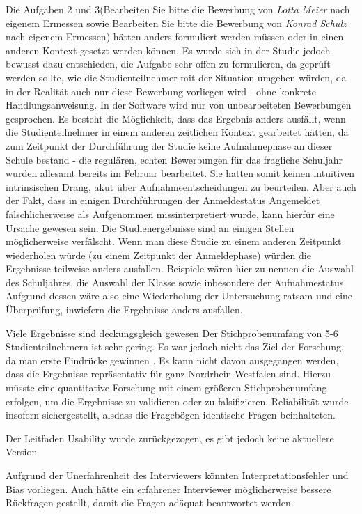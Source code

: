 Die Aufgaben 2 und 3(\glqq Bearbeiten Sie bitte die Bewerbung von \textit{Lotta Meier} nach eigenem Ermessen\grqq{} sowie \grqq{}Bearbeiten Sie bitte die Bewerbung von \textit{Konrad Schulz} nach eigenem Ermessen\grqq{}) hätten anders formuliert werden müssen oder in einen anderen Kontext gesetzt werden können. Es wurde sich in der Studie jedoch bewusst dazu entschieden, die Aufgabe sehr offen zu formulieren, da geprüft werden sollte, wie die Studienteilnehmer mit der Situation umgehen würden, da in der Realität auch nur diese Bewerbung vorliegen wird - ohne konkrete Handlungsanweisung. In der Software wird nur von \glqq unbearbeiteten Bewerbungen\grqq{} gesprochen. Es besteht die Möglichkeit, dass das Ergebnis anders ausfällt, wenn die Studienteilnehmer in einem anderen zeitlichen Kontext gearbeitet hätten, da zum Zeitpunkt der Durchführung der Studie keine Aufnahmephase an dieser Schule bestand - die regulären, echten Bewerbungen für das fragliche Schuljahr wurden allesamt bereits im Februar bearbeitet. Sie hatten somit keinen intuitiven intrinsischen Drang, akut über Aufnahmeentscheidungen zu beurteilen. Aber auch der Fakt, dass in einigen Durchführungen der Anmeldestatus \glqq Angemeldet\grqq{} fälschlicherweise als \glqq Aufgenommen\grqq{} missinterpretiert wurde, kann hierfür eine Ursache gewesen sein.
Die Studienergebnisse sind an einigen Stellen möglicherweise verfälscht. Wenn man diese Studie zu einem anderen Zeitpunkt wiederholen würde (zu einem Zeitpunkt der Anmeldephase) würden die Ergebnisse teilweise anders ausfallen. Beispiele wären hier zu nennen die Auswahl des Schuljahres, die Auswahl der Klasse sowie inbesondere der Aufnahmestatus. Aufgrund dessen wäre also eine Wiederholung der Untersuchung ratsam und eine Überprüfung, inwiefern die Ergebnisse anders ausfallen.

Viele Ergebnisse sind deckungsgleich gewesen
Der Stichprobenumfang von 5-6 Studienteilnehmern ist sehr gering. Es war jedoch nicht das Ziel der Forschung, da man erste Eindrücke gewinnen . Es kann nicht davon ausgegangen werden, dass die Ergebnisse repräsentativ für ganz Nordrhein-Westfalen sind. Hierzu müsste eine quantitative Forschung mit einem größeren Stichprobenumfang erfolgen, um die Ergebnisse zu validieren oder zu falsifizieren.
Reliabilität wurde insofern sichergestellt, alsdass die Fragebögen identische Fragen beinhalteten. 

Der Leitfaden Usability wurde zurückgezogen, es gibt jedoch keine aktuellere Version

Aufgrund der Unerfahrenheit des Interviewers könnten Interpretationsfehler und Bias vorliegen. Auch hätte ein erfahrener Interviewer möglicherweise bessere Rückfragen gestellt, damit die Fragen adäquat beantwortet werden.

